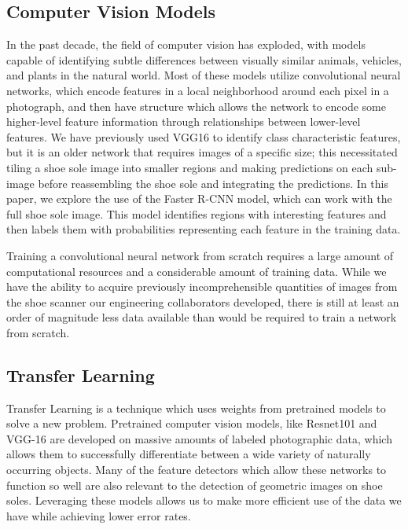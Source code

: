 \documentclass[10pt]{article}
\newcommand{\svp}[1]{{\textcolor{RedOrange}{#1}}}
\begin{document}
\subsection{Computer Vision Models}
\svp{In the past decade, the field of computer vision has exploded, with models capable of identifying subtle differences between visually similar animals, vehicles, and plants in the natural world.
Most of these models utilize convolutional neural networks, which encode features in a local neighborhood around each pixel in a photograph, and then have structure which allows the network to encode some higher-level feature information through relationships between lower-level features.
We have previously used VGG16 to identify class characteristic features, but it is an older network that requires images of a specific size; this necessitated tiling a shoe sole image into smaller regions and making predictions on each sub-image before reassembling the shoe sole and integrating the predictions.
In this paper, we explore the use of the Faster R-CNN model, which can work with the full shoe sole image.
This model identifies regions with interesting features and then labels them with probabilities representing each feature in the training data.
}

\svp{
Training a convolutional neural network from scratch requires a large amount of computational resources and a considerable amount of training data.
While we have the ability to acquire previously incomprehensible quantities of images from the shoe scanner our engineering collaborators developed, there is still at least an order of magnitude less data available than would be required to train a network from scratch.
}



\subsection{Transfer Learning}
Transfer Learning is a technique \svp{which} uses weights from pretrained models to solve a new problem.
Pretrained \svp{computer vision} models, like Resnet101 \svp{and} VGG-16 \svp{are developed} on massive \svp{amounts of labeled photographic} data\svp{, which allows them to successfully differentiate between a wide variety of naturally occurring objects}.
\svp{Many of the feature detectors which allow these networks to function so well are also relevant to the detection of geometric images on shoe soles.}
\svp{Leveraging} these models \svp{allows us to make more efficient use of the data we have} while achieving lower error rates.
\end{document}
